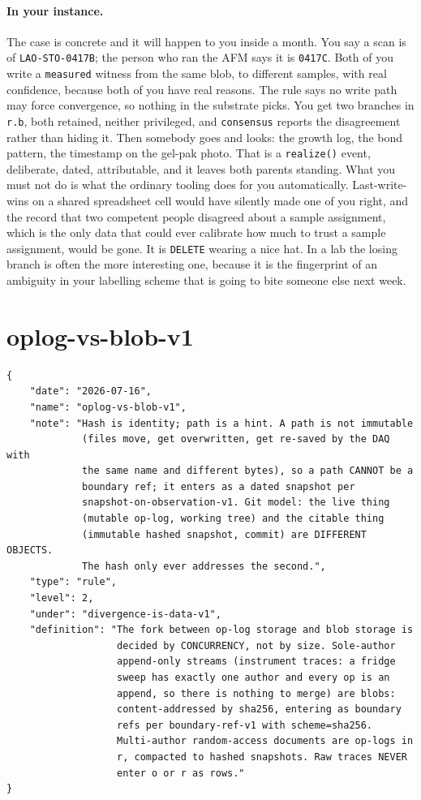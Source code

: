 \paragraph{In your instance.} The case is concrete and it will happen to you inside a month. You say a scan is of \texttt{LAO-STO-0417B}; the person who ran the AFM says it is \texttt{0417C}. Both of you write a \texttt{measured} witness from the same blob, to different samples, with real confidence, because both of you have real reasons. The rule says no write path may force convergence, so nothing in the substrate picks. You get two branches in \texttt{r.b}, both retained, neither privileged, and \texttt{consensus} reports the disagreement rather than hiding it. Then somebody goes and looks: the growth log, the bond pattern, the timestamp on the gel-pak photo. That is a \texttt{realize()} event, deliberate, dated, attributable, and it leaves both parents standing. What you must not do is what the ordinary tooling does for you automatically. Last-write-wins on a shared spreadsheet cell would have silently made one of you right, and the record that two competent people disagreed about a sample assignment, which is the only data that could ever calibrate how much to trust a sample assignment, would be gone. It is \texttt{DELETE} wearing a nice hat. In a lab the losing branch is often the more interesting one, because it is the fingerprint of an ambiguity in your labelling scheme that is going to bite someone else next week.

\section{oplog-vs-blob-v1}

\begin{lstlisting}[language={},basicstyle=\ttfamily\footnotesize]
{
    "date": "2026-07-16",
    "name": "oplog-vs-blob-v1",
    "note": "Hash is identity; path is a hint. A path is not immutable
             (files move, get overwritten, get re-saved by the DAQ with
             the same name and different bytes), so a path CANNOT be a
             boundary ref; it enters as a dated snapshot per
             snapshot-on-observation-v1. Git model: the live thing
             (mutable op-log, working tree) and the citable thing
             (immutable hashed snapshot, commit) are DIFFERENT OBJECTS.
             The hash only ever addresses the second.",
    "type": "rule",
    "level": 2,
    "under": "divergence-is-data-v1",
    "definition": "The fork between op-log storage and blob storage is
                   decided by CONCURRENCY, not by size. Sole-author
                   append-only streams (instrument traces: a fridge
                   sweep has exactly one author and every op is an
                   append, so there is nothing to merge) are blobs:
                   content-addressed by sha256, entering as boundary
                   refs per boundary-ref-v1 with scheme=sha256.
                   Multi-author random-access documents are op-logs in
                   r, compacted to hashed snapshots. Raw traces NEVER
                   enter o or r as rows."
}
\end{lstlisting}


